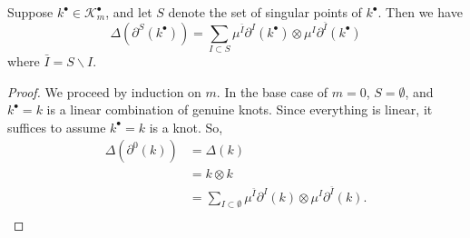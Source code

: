 \begin{lemma}[Willerton]
	\label{lem:co-leibniz-formula-for-knots}
	Suppose \(k^{\bullet} \in \mathcal{K}^{\bullet}_{m}\), and let \(S\) denote the set of singular points of \(k^{\bullet}\). Then we have
	\[
		\Delta(\partial^{S}(k^{\bullet}))
		=
		\sum_{I \subset S} \mu^{\bar{I}}\partial^{I}(k^{\bullet})
		\otimes
		\mu^{I}\partial^{\bar{I}}(k^{\bullet})
	\]
	where \(\bar{I} = S \smallsetminus I\).
\end{lemma}

\begin{proof}
	We proceed by induction on \(m\). In the base case of \(m = 0\), \(S = \emptyset\), and \(k^{\bullet} = k\) is a linear combination of genuine knots. Since everything is linear, it suffices to assume \(k^{\bullet} = k\) is a knot. So,
	\begin{align*}
		\Delta(\partial^{0}(k))
		& = \Delta(k) \\
		& = k \otimes k \\
		& = \sum_{I \subset \emptyset}
			\mu^{\bar{I}}\partial^{I}(k)
			\otimes
			\mu^{I}\partial^{\bar{I}}(k). \\
	\end{align*}


\end{proof}
